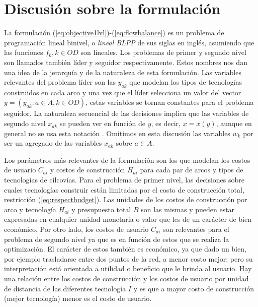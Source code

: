 \section*{Discusión sobre la formulación}

La formulación (\ref{eq:objective1lvl})-(\ref{eq:flowbalance}) es un problema de programación lineal binivel, o {\it lineal BLPP} de sus siglas en inglés, asumiendo que las funciones $f_k, k\in OD$ son lineales. Los problemas de primer y segundo nivel son llamados también líder y seguidor respectivamente. Estos nombres nos dan una idea de la jerarquía y de la naturaleza de esta formulación. Las variables relevantes del problema líder son las $y_{ak}$ que modelan los tipos de tecnologías construidos en cada arco y una vez que el líder selecciona un valor del vector $y = \left( y_{ak}: a \in A, k \in OD \right)$, estas variables se tornan constantes para el problema seguidor. La naturaleza secuencial de las decisiones implica que las variables de segundo nivel $x_{ak}$ se pueden ver en función de $y$, es decir, $x = x(y)$, aunque en general no se usa esta notación \citep{bardbook}. Omitimos en esta discusión las variables $w_k$ por ser un agregado de las variables $x_{ak}$ sobre $a \in A$.


Los parámetros más relevantes de la formulación son los que modelan los costos de usuario $C_{ai}$ y costos de construcción $H_{ai}$ para cada par de arcos y tipos de tecnologías de cilcovías. Para el problema de primer nivel, las decisiones sobre cuales tecnologías construir están limitadas por el costo de construcción total, restricción (\ref{eq:respectbudget}). Las unidades de los costos de construcción por arco y tecnología $H_{ai}$ y presupuesto total $B$ son las mismas y pueden estar expresadas en cualquier unidad monetaria o valor que les de un carácter de bien económico. Por otro lado, los costos de usuario $C_{ai}$ son relevantes para el problema de segundo nivel ya que es en función de estos que se realiza la optimización. El carácter de estos también es económico, ya que dado un bien, por ejemplo trasladarse entre dos puntos de la red, a menor costo mejor; pero su interpretación está orientada a utilidad o beneficio que le brinda al usuario. Hay una relación entre los costos de construcción y los costos de usuario por unidad de distancia de las diferentes tecnología $I$ y es que a mayor costo de construcción (mejor tecnología) menor es el costo de usuario.

